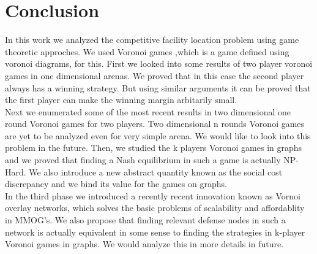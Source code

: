 \documentclass[12pt]{article}
\begin{document}
\section{Conclusion}

\indent \indent In this work we analyzed the competitive facility location problem using game theoretic approches. We used Voronoi games ,which is a game defined using voronoi diagrams, for this. First we looked into some results of two player voronoi games in one dimensional arenas. We proved that in this case the second player always has a winning strategy. But using similar arguments it can be proved that the first player can make the winning margin arbitarily small. \\

Next we enumerated some of the most recent results in two dimensional one round Voronoi games for two players. Two dimensional n rounds Voronoi games are yet to be analyzed even for very simple arena. We would like to look into this problem in the future. Then, we studied the k players  Voronoi games in graphs and we proved that finding a Nash equilibrium in such a game is actually NP-Hard. We also introduce a new abstract quantity known as the social cost discrepancy and we bind its value for the games on graphs.\\

In the third phase we introduced a recently recent innovation known as Vornoi overlay networks, which solves the basic problems of scalability and affordablity in MMOG's. We also propose that finding relevant defense nodes in such a network is actually equivalent in some sense to finding the strategies in k-player Voronoi games in graphs. We would analyze this in more details in future.     
\newpage




\end{document}
